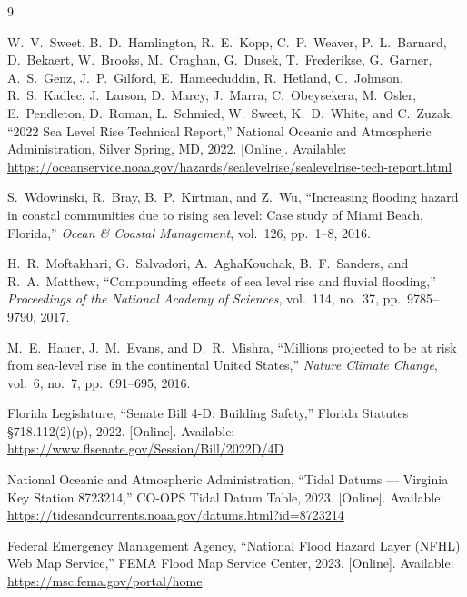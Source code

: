 \documentclass[conference]{IEEEtran}
\begin{document}
\begin{thebibliography}{9}

W.~V.~Sweet, B.~D.~Hamlington, R.~E.~Kopp, C.~P.~Weaver,
P.~L.~Barnard, D.~Bekaert, W.~Brooks, M.~Craghan,
G.~Dusek, T.~Frederikse, G.~Garner, A.~S.~Genz,
J.~P.~Gilford, E.~Hameeduddin, R.~Hetland,
C.~Johnson, R.~S.~Kadlec, J.~Larson, D.~Marcy,
J.~Marra, C.~Obeysekera, M.~Osler, E.~Pendleton,
D.~Roman, L.~Schmied, W.~Sweet, K.~D.~White,
and C.~Zuzak,
``2022 Sea Level Rise Technical Report,''
National Oceanic and Atmospheric Administration,
Silver Spring, MD, 2022.
[Online]. Available:
\url{https://oceanservice.noaa.gov/hazards/sealevelrise/sealevelrise-tech-report.html}

S.~Wdowinski, R.~Bray, B.~P.~Kirtman, and Z.~Wu,
``Increasing flooding hazard in coastal communities
due to rising sea level: Case study of Miami Beach,
Florida,''
\textit{Ocean \& Coastal Management}, vol.~126,
pp.~1--8, 2016.

H.~R.~Moftakhari, G.~Salvadori, A.~AghaKouchak,
B.~F.~Sanders, and R.~A.~Matthew,
``Compounding effects of sea level rise and fluvial
flooding,''
\textit{Proceedings of the National Academy of Sciences},
vol.~114, no.~37, pp.~9785--9790, 2017.

M.~E.~Hauer, J.~M.~Evans, and D.~R.~Mishra,
``Millions projected to be at risk from sea-level rise
in the continental United States,''
\textit{Nature Climate Change}, vol.~6, no.~7,
pp.~691--695, 2016.

Florida Legislature,
``Senate Bill 4-D: Building Safety,''
Florida Statutes \S{}718.112(2)(p), 2022.
[Online]. Available:
\url{https://www.flsenate.gov/Session/Bill/2022D/4D}

National Oceanic and Atmospheric Administration,
``Tidal Datums --- Virginia Key Station 8723214,''
CO-OPS Tidal Datum Table, 2023.
[Online]. Available:
\url{https://tidesandcurrents.noaa.gov/datums.html?id=8723214}

Federal Emergency Management Agency,
``National Flood Hazard Layer (NFHL) Web Map Service,''
FEMA Flood Map Service Center, 2023.
[Online]. Available:
\url{https://msc.fema.gov/portal/home}

\end{thebibliography}
\end{document}
